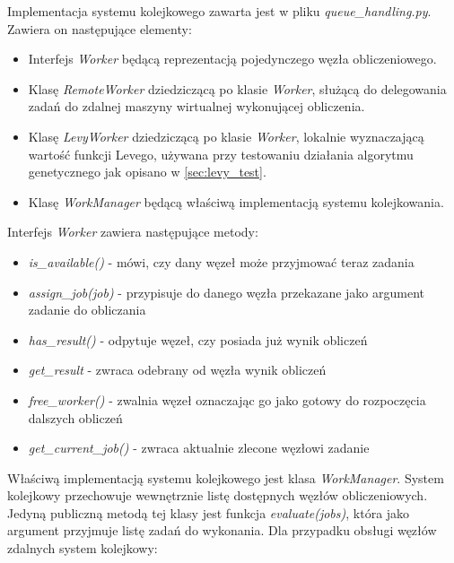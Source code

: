 Implementacja systemu kolejkowego zawarta jest w pliku \textit{queue\_handling.py}.
Zawiera on następujące elementy:

\begin{itemize}
  \item Interfejs \textit{Worker} będącą reprezentacją pojedynczego węzła obliczeniowego.
  \item Klasę \textit{RemoteWorker} dziedziczącą po klasie \textit{Worker}, służącą do delegowania zadań do zdalnej maszyny wirtualnej wykonującej obliczenia.
  \item Klasę \textit{LevyWorker} dziedziczącą po klasie \textit{Worker}, lokalnie wyznaczającą wartość funkcji Levego, używana przy testowaniu działania algorytmu genetycznego jak opisano w \ref{sec:levy_test}.
  \item Klasę \textit{WorkManager} będącą właściwą implementacją systemu kolejkowania.
\end{itemize}

Interfejs \textit{Worker} zawiera następujące metody:
\begin{itemize}
  \item \textit{is\_available()} - mówi, czy dany węzeł może przyjmować teraz zadania
  \item \textit{assign\_job(job)} - przypisuje do danego węzła przekazane jako argument zadanie do obliczania
  \item \textit{has\_result()} - odpytuje węzeł, czy posiada już wynik obliczeń
  \item \textit{get\_result{}} - zwraca odebrany od węzła wynik obliczeń
  \item \textit{free\_worker()} - zwalnia węzeł oznaczając go jako gotowy do rozpoczęcia dalszych obliczeń
  \item \textit{get\_current\_job()} - zwraca aktualnie zlecone węzłowi zadanie
\end{itemize}

Właściwą implementacją systemu kolejkowego jest klasa \textit{WorkManager}.
System kolejkowy przechowuje wewnętrznie listę dostępnych węzłów obliczeniowych.
Jedyną publiczną metodą tej klasy jest funkcja \textit{evaluate(jobs)}, która jako argument przyjmuje listę zadań do wykonania.
Dla przypadku obsługi węzłów zdalnych system kolejkowy:

